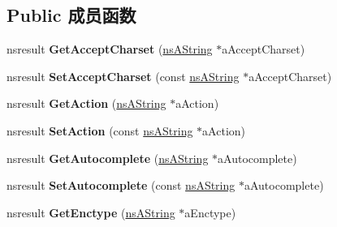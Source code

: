 \subsection*{Public 成员函数}
\begin{DoxyCompactItemize}
\item 
\mbox{\label{interfacens_i_d_o_m_h_t_m_l_form_element_a3519e7b9d76ef268b99cab3a0bb57266}} 
nsresult {\bfseries Get\+Accept\+Charset} (\hyperlink{structns_string_container}{ns\+A\+String} $\ast$a\+Accept\+Charset)
\item 
\mbox{\label{interfacens_i_d_o_m_h_t_m_l_form_element_ab4e3fd72715fc20e526d57ad50cc3293}} 
nsresult {\bfseries Set\+Accept\+Charset} (const \hyperlink{structns_string_container}{ns\+A\+String} $\ast$a\+Accept\+Charset)
\item 
\mbox{\label{interfacens_i_d_o_m_h_t_m_l_form_element_ad35b18d17d8953701572ae1f81d9ff38}} 
nsresult {\bfseries Get\+Action} (\hyperlink{structns_string_container}{ns\+A\+String} $\ast$a\+Action)
\item 
\mbox{\label{interfacens_i_d_o_m_h_t_m_l_form_element_aa601c2719ce4c6b29703c075843f8407}} 
nsresult {\bfseries Set\+Action} (const \hyperlink{structns_string_container}{ns\+A\+String} $\ast$a\+Action)
\item 
\mbox{\label{interfacens_i_d_o_m_h_t_m_l_form_element_a225f7159174826cda099fdb71e2ae88b}} 
nsresult {\bfseries Get\+Autocomplete} (\hyperlink{structns_string_container}{ns\+A\+String} $\ast$a\+Autocomplete)
\item 
\mbox{\label{interfacens_i_d_o_m_h_t_m_l_form_element_a287dd8e5372502b789d7124921e438e8}} 
nsresult {\bfseries Set\+Autocomplete} (const \hyperlink{structns_string_container}{ns\+A\+String} $\ast$a\+Autocomplete)
\item 
\mbox{\label{interfacens_i_d_o_m_h_t_m_l_form_element_aba2d7d6d8467a180fa91128eecd0370b}} 
nsresult {\bfseries Get\+Enctype} (\hyperlink{structns_string_container}{ns\+A\+String} $\ast$a\+Enctype)

\end{DoxyCompactItemize}
